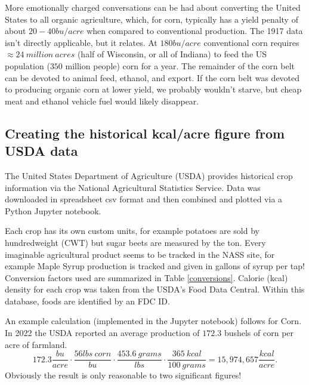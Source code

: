 \documentclass[jou]{apa7}
\newcommand{\be}{\begin{equation}}
\newcommand{\ee}{\end{equation}}
\begin{document}
More emotionally charged conversations can be had about converting the United States to all organic agriculture, which, for corn, typically has a yield penalty of about $20-40bu/acre$ when compared to conventional production.  The 1917 data isn't directly applicable, but it relates. At $180bu/acre$ conventional corn requires $\approx 24~million~acres$ (half of Wisconsin, or all of Indiana) to feed the US population ($350$ million people) corn for a year.  The remainder of the corn belt can be devoted to animal feed, ethanol, and export.  If the corn belt was devoted to producing organic corn at lower yield,\cite{organic_corn_yield} we probably wouldn't starve, but cheap meat and ethanol vehicle fuel would likely disappear.   

\subsection{Creating the historical kcal/acre figure from USDA data}
\label{how_yield_plot_is_made}
The United States Department of Agriculture (USDA) provides historical crop information via the National Agricultural Statistics Service.\cite{USDA_NASS}
Data was downloaded in spreadsheet csv format and then combined and plotted via a Python Jupyter notebook.   

Each crop has its own custom units, for example potatoes are sold by hundredweight (CWT) but sugar beets are measured by the ton.  
Every imaginable agricultural product seems to be tracked in the NASS site, for example Maple Syrup production is tracked and given in gallons of syrup per tap! 
Conversion factors used are summarized in Table \ref{conversions}.  
Calorie (kcal) density for each crop was taken from the USDA's Food Data Central.\cite{USDA_FDC}
Within this database, foods are identified by an FDC ID.  

An example calculation (implemented in the Jupyter notebook) follows for Corn.  
In 2022 the USDA reported an average production of $172.3$ bushels of corn per acre of farmland.  
\be
172.3\frac{bu}{acre}\cdot\frac{56lbs~corn}{bu}\cdot\frac{453.6~grams}{lbs}\cdot\frac{365~kcal}{100~grams} = 15,974,657 \frac{kcal}{acre} .
\label{example_calculation}
\ee
Obviously the result is only reasonable to two significant figures!
\end{document}
